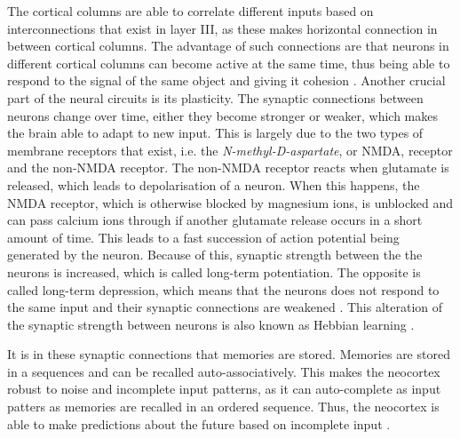  The cortical columns are able to correlate different inputs based on interconnections that exist in layer III, as these makes horizontal connection in between cortical columns. The advantage of such connections are that neurons in different cortical columns can become active at the same time, thus being able to respond to the signal of the same object and giving it cohesion \cite{Neocortex}. Another crucial part of the neural circuits is its plasticity. The synaptic connections between neurons change over time, either they become stronger or weaker, which makes the brain able to adapt to new input. This is largely due to the two types of membrane receptors that exist, i.e. the \textit{N-methyl-D-aspartate}, or NMDA, receptor and the non-NMDA receptor. The non-NMDA receptor reacts when glutamate is released, which leads to depolarisation of a neuron. When this happens, the NMDA receptor, which is otherwise blocked by magnesium ions, is unblocked and can pass calcium ions through if another glutamate release occurs in a short amount of time. This leads to a fast succession of action potential being generated by the neuron. Because of this, synaptic strength between the the neurons is increased, which is called long-term potentiation. The opposite is called long-term depression, which means that the neurons does not respond to the same input and their synaptic connections are weakened \cite{Neocortex}. This alteration of the synaptic strength between neurons is also known as Hebbian learning \cite{CapaldiE.John1992TOOB}. 
 
 It is in these synaptic connections that memories are stored. Memories are stored in a sequences and can be recalled auto-associatively. This makes the neocortex robust to noise and incomplete input patterns, as it can auto-complete as input patters as memories are recalled in an ordered sequence. Thus, the neocortex is able to make predictions about the future based on incomplete input \cite{memory}. 